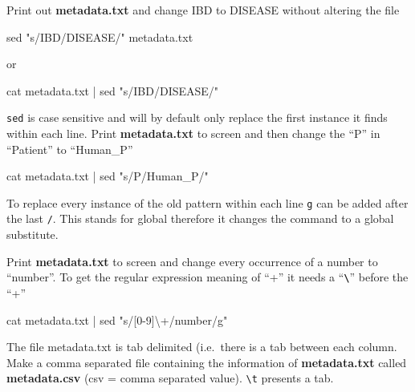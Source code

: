 \documentclass[
  letterpaper,
  DIV=11,
  numbers=noendperiod]{scrreprt}
\newenvironment{Shaded}{\begin{snugshade}}{\end{snugshade}}
\newcommand{\FunctionTok}[1]{\textcolor[rgb]{0.28,0.35,0.67}{#1}}
\newcommand{\KeywordTok}[1]{\textcolor[rgb]{0.00,0.23,0.31}{#1}}
\newcommand{\NormalTok}[1]{\textcolor[rgb]{0.00,0.23,0.31}{#1}}
\newcommand{\StringTok}[1]{\textcolor[rgb]{0.13,0.47,0.30}{#1}}
\begin{document}
Print out \textbf{metadata.txt} and change IBD to DISEASE without
altering the file

\begin{Shaded}
\begin{Highlighting}[]
\FunctionTok{sed} \StringTok{"s/IBD/DISEASE/"}\NormalTok{ metadata.txt}
\end{Highlighting}
\end{Shaded}

or

\begin{Shaded}
\begin{Highlighting}[]
\FunctionTok{cat}\NormalTok{ metadata.txt }\KeywordTok{|} \FunctionTok{sed} \StringTok{"s/IBD/DISEASE/"}
\end{Highlighting}
\end{Shaded}

\texttt{sed} is case sensitive and will by default only replace the
first instance it finds within each line. Print \textbf{metadata.txt} to
screen and then change the ``P'' in ``Patient'' to ``Human\_P''

\begin{Shaded}
\begin{Highlighting}[]
\FunctionTok{cat}\NormalTok{ metadata.txt }\KeywordTok{|} \FunctionTok{sed} \StringTok{"s/P/Human\_P/"}
\end{Highlighting}
\end{Shaded}

To replace every instance of the old pattern within each line \texttt{g}
can be added after the last \texttt{/}. This stands for global therefore
it changes the command to a global substitute.

Print \textbf{metadata.txt} to screen and change every occurrence of a
number to ``number''. To get the regular expression meaning of ``+'' it
needs a ``\textbf{\texttt{\textbackslash{}}}'' before the ``+''

\begin{Shaded}
\begin{Highlighting}[]
\FunctionTok{cat}\NormalTok{ metadata.txt }\KeywordTok{|} \FunctionTok{sed} \StringTok{"s/[0{-}9]\textbackslash{}+/number/g"}
\end{Highlighting}
\end{Shaded}

The file metadata.txt is tab delimited (i.e.~there is a tab between each
column. Make a comma separated file containing the information of
\textbf{metadata.txt} called \textbf{metadata.csv} (csv = comma
separated value). \texttt{\textbackslash{}t} presents a tab.
\end{document}
